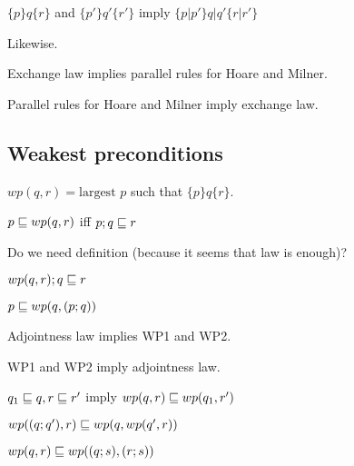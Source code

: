 \documentclass{article}
\begin{document}
\begin{rul}
$\{p\}q\{r\}$ and $\{p'\}q'\{r'\}$ imply $\{p|p'\} q|q' \{r|r'\}$
\end{rul}

\begin{rul}
Likewise.
\end{rul}

\begin{theorem}
Exchange law implies parallel rules for Hoare and Milner.
\end{theorem}

\begin{theorem}
Parallel rules for Hoare and Milner imply exchange law.
\end{theorem}


\subsection*{Weakest preconditions}

\begin{definition}
$wp(q, r) = \textrm{largest } p$ such that $\{p\}q\{r\}$.
\end{definition}

\begin{law}[adjointness]
$p\sqsubseteq wp(q, r)$ iff $p;q \sqsubseteq r$
\end{law}

Do we need  definition (because it seems that law is enough)?

\begin{rul}[WP1]
$wp(q, r); q \sqsubseteq r$
\end{rul}

\begin{rul}[WP2]
$p \sqsubseteq wp(q, (p;q))$
\end{rul}

\begin{theorem}
Adjointness law implies WP1 and WP2.
\end{theorem}

\begin{theorem}
WP1 and WP2 imply adjointness law.
\end{theorem}



\begin{theorem}[wp monotonicity]
$q_1 \sqsubseteq q, r \sqsubseteq r'$ imply $wp(q, r) \sqsubseteq wp(q_1, r')$
\end{theorem}

\begin{theorem}[stepwise wp]
$wp((q;q'), r) \sqsubseteq wp(q, wp(q', r))$
\end{theorem}

\begin{theorem}
$wp(q, r) \sqsubseteq wp((q;s), (r;s))$
\end{theorem}
\end{document}
